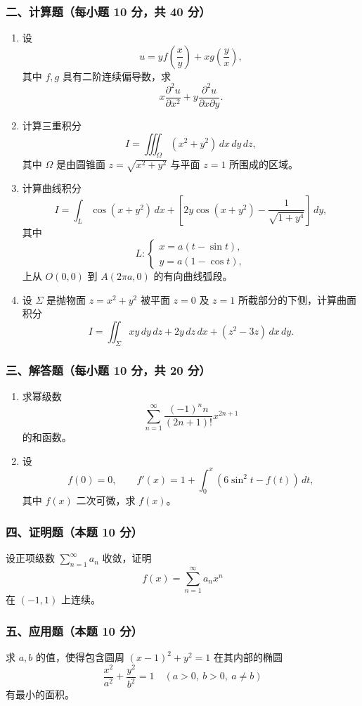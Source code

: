 \subsubsection*{二、计算题（每小题 10 分，共 40 分）}
\begin{enumerate}
  \item 设
  \[
  u=yf\!\left(\frac{x}{y}\right)+xg\!\left(\frac{y}{x}\right),
  \]
  其中 $f,g$ 具有二阶连续偏导数，求
  \[
  x\frac{\partial^2u}{\partial x^2}+y\frac{\partial^2u}{\partial x\partial y}.
  \]
  \item 计算三重积分
  \[
  I=\iiint_\Omega (x^2+y^2)\,dx\,dy\,dz,
  \]
  其中 $\Omega$ 是由圆锥面 $z=\sqrt{x^2+y^2}$ 与平面 $z=1$ 所围成的区域。
  \item 计算曲线积分
  \[
  I=\int_L \cos(x+y^2)\,dx+\left[2y\cos(x+y^2)-\frac1{\sqrt{1+y^4}}\right]\,dy,
  \]
  其中
  \[
  L:\begin{cases}
  x=a(t-\sin t),\\
  y=a(1-\cos t),
  \end{cases}
  \]
  上从 $O(0,0)$ 到 $A(2\pi a,0)$ 的有向曲线弧段。
  \item 设 $\Sigma$ 是抛物面 $z=x^2+y^2$ 被平面 $z=0$ 及 $z=1$ 所截部分的下侧，计算曲面积分
  \[
  I=\iint_\Sigma xy\,dy\,dz+2y\,dz\,dx+(z^2-3z)\,dx\,dy.
  \]
\end{enumerate}

\subsubsection*{三、解答题（每小题 10 分，共 20 分）}
\begin{enumerate}
  \item 求幂级数
  \[
  \sum_{n=1}^{\infty}\frac{(-1)^n n}{(2n+1)!}x^{2n+1}
  \]
  的和函数。
  \item 设
  \[
  f(0)=0,\qquad f'(x)=1+\int_0^x(6\sin^2t-f(t))\,dt,
  \]
  其中 $f(x)$ 二次可微，求 $f(x)$。
\end{enumerate}

\subsubsection*{四、证明题（本题 10 分）}
设正项级数 $\sum_{n=1}^{\infty}a_n$ 收敛，证明
\[
f(x)=\sum_{n=1}^{\infty}a_nx^n
\]
在 $(-1,1)$ 上连续。

\subsubsection*{五、应用题（本题 10 分）}
求 $a,b$ 的值，使得包含圆周 $(x-1)^2+y^2=1$ 在其内部的椭圆
\[
\frac{x^2}{a^2}+\frac{y^2}{b^2}=1\quad(a>0,\ b>0,\ a\ne b)
\]
有最小的面积。

